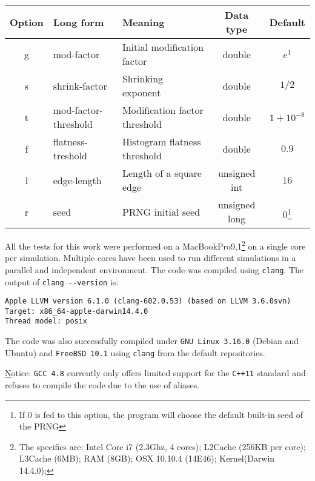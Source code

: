 \documentclass[11pt]{article}
\begin{document}
\begin{center}
\label{tab:options}
\begin{tabular}{cllcc}
\toprule
Option	&	Long form				&	Meaning							& Data type			& Default		\\
\midrule
g 		&	mod-factor				&	Initial modification factor		& double			& $e^1$			\\
s 		&	shrink-factor			&	Shrinking exponent				& double			& $1/2$			\\
t 		&	mod-factor-threshold	&	Modification factor threshold	& double			& $1 + 10^{-8}$	\\
f 		&	flatness-treshold		&	Histogram flatness threshold	& double 			& $0.9$			\\
l 		&	edge-length				&	Length of a square edge			& unsigned int		& $16$			\\
r 		&	seed					&	PRNG initial seed				& unsigned long		& $0$\footnote{If $0$ is fed to this option, the program will choose the default built-in seed of the PRNG}			\\
\bottomrule
\end{tabular}
\end{center}

All the tests for this work were performed on a MacBookPro9,1\footnote{The specifics are: 
Intel Core i7 (2.3Ghz, 4 cores); L2Cache (256KB per core); L3Cache (6MB); RAM (8GB); OSX 10.10.4 (14E46); Kernel(Darwin 14.4.0);} on a single core per simulation. Multiple cores have been used to run different simulations in a parallel and independent environment. The code was compiled using \verb|clang|. The output of \verb|clang --version| is: \begin{verbatim}
Apple LLVM version 6.1.0 (clang-602.0.53) (based on LLVM 3.6.0svn)
Target: x86_64-apple-darwin14.4.0
Thread model: posix
\end{verbatim}

The code was also successfully compiled under \verb|GNU Linux 3.16.0| (Debian and Ubuntu)  and \verb|FreeBSD 10.1| using \verb|clang| from the default repositories.

{\underline Notice:} \verb|GCC 4.8| currently only offers limited support for the \verb|C++11| standard and refuses to compile the code due to the use of aliases.
\end{document}
